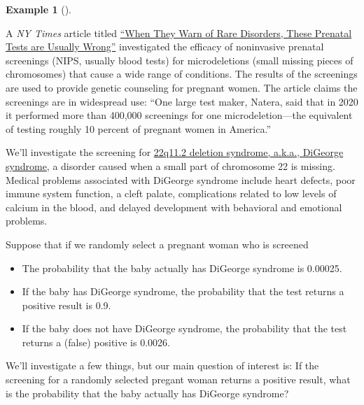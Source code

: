 \documentclass[
  letterpaper,
  DIV=11,
  numbers=noendperiod]{scrreprt}
\providecommand{\tightlist}{%
  \setlength{\itemsep}{0pt}\setlength{\parskip}{0pt}}
\theoremstyle{plain}
\theoremstyle{definition}
\newtheorem{example}{Example}[chapter]
\theoremstyle{definition}
\theoremstyle{definition}
\theoremstyle{remark}
\begin{document}
\begin{tcolorbox}[enhanced jigsaw, opacityback=0, left=2mm, colframe=quarto-callout-note-color-frame, toprule=.15mm, breakable, colback=white, leftrule=.75mm, arc=.35mm, rightrule=.15mm, bottomrule=.15mm]

\begin{example}[]\protect\hypertarget{exm-bayes-false-positive-twoway}{}\label{exm-bayes-false-positive-twoway}

A \emph{NY Times} article titled
\href{https://www.nytimes.com/2022/01/01/upshot/pregnancy-birth-genetic-testing.html}{``When
They Warn of Rare Disorders, These Prenatal Tests are Usually Wrong''}
investigated the efficacy of noninvasive prenatal screenings (NIPS,
usually blood tests) for microdeletions (small missing pieces of
chromosomes) that cause a wide range of conditions. The results of the
screenings are used to provide genetic counseling for pregnant women.
The article claims the screenings are in widespread use: ``One large
test maker, Natera, said that in 2020 it performed more than 400,000
screenings for one microdeletion---the equivalent of testing roughly 10
percent of pregnant women in America.''

We'll investigate the screening for
\href{https://www.mayoclinic.org/diseases-conditions/digeorge-syndrome/symptoms-causes/syc-20353543}{22q11.2
deletion syndrome, a.k.a., DiGeorge syndrome}, a disorder caused when a
small part of chromosome 22 is missing. Medical problems associated with
DiGeorge syndrome include heart defects, poor immune system function, a
cleft palate, complications related to low levels of calcium in the
blood, and delayed development with behavioral and emotional problems.

Suppose that if we randomly select a pregnant woman who is
screened\footnotemark{}

\begin{itemize}
\tightlist
\item
  The probability that the baby actually has DiGeorge syndrome is
  0.00025.
\item
  If the baby has DiGeorge syndrome, the probability that the test
  returns a positive result\footnotemark{} is 0.9.
\item
  If the baby does not have DiGeorge syndrome, the probability that the
  test returns a (false) positive is 0.0026.
\end{itemize}

We'll investigate a few things, but our main question of interest is: If
the screening for a randomly selected pregant woman returns a positive
result\footnotemark{}, what is the probability that the baby actually
has DiGeorge syndrome?


\end{example}
\end{tcolorbox}
\end{document}
